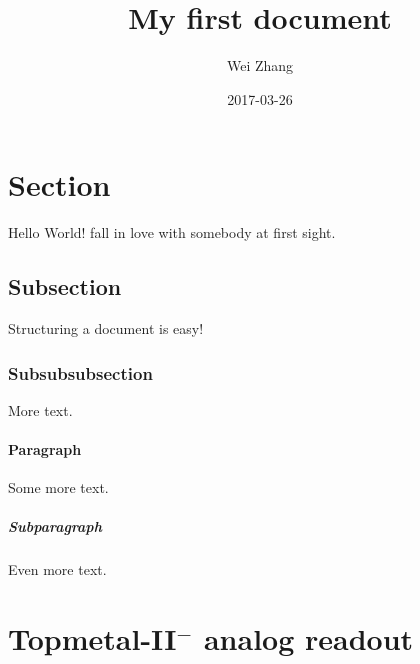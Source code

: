 \documentclass[18pt]{article}
\title{My first document}
\date{2017-03-26}
\author{Wei Zhang}
\begin{document}
\maketitle
\newpage

\section{Section}

Hello World! fall in love with somebody at first sight.

\subsection{Subsection}

Structuring a document is easy!

\subsubsection{Subsubsubsection}

More text.

\paragraph{Paragraph}

Some more text.

\subparagraph{Subparagraph}

Even more text.

\section{Topmetal-II$^-$ analog readout}
\end{document}
